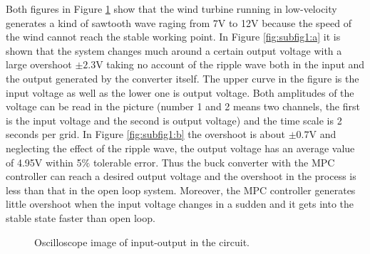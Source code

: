 \documentclass[journal]{IEEEtran}
\begin{document}
Both figures  in Figure \ref{fig:subfigosci} show that the wind turbine running in low-velocity generates a kind of sawtooth wave raging from 7V to 12V because the speed of the wind cannot reach the stable working point. In Figure \ref{fig:subfig1:a} it is shown that the system  changes much  around a certain output voltage with a large overshoot $ \pm 2.3$V taking no account of the ripple wave both in the input and the output generated by the converter itself. The upper curve in the figure is the input voltage as well as the lower one is output voltage. Both amplitudes of the voltage can be read in the picture (number 1 and 2 means two channels, the first is the input voltage and the second is output voltage) and the time scale is 2 seconds per grid. In Figure \ref{fig:subfig1:b} the overshoot is about $ \pm 0.7$V and neglecting the effect of the ripple wave, the output voltage has an average value of 4.95V  within  5$\%$ tolerable error. Thus the buck converter with the MPC controller can reach a desired output voltage and the overshoot in the process is less than that in the open loop system. Moreover, the MPC controller generates little overshoot when the input voltage changes in a sudden and it gets into the stable state faster than open loop.
\begin{figure}
	\centering
	\hspace{0.5in}
	\caption{Oscilloscope image of input-output in the circuit. }
	\label{fig:subfigosci}
\end{figure}
\end{document}

